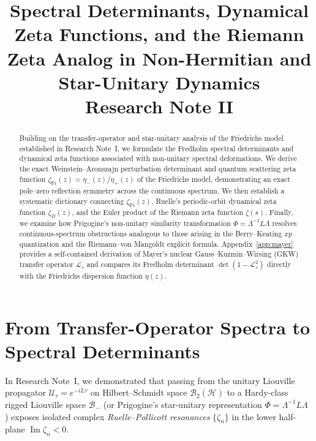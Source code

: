 \documentclass[11pt,a4paper]{article}
\title{\textbf{Spectral Determinants, Dynamical Zeta Functions, and the Riemann Zeta Analog in Non-Hermitian and Star-Unitary Dynamics}\\[0.4em]
\large Research Note II}
\author{}
\date{}
\newcommand{\Imag}{\operatorname{Im}}
\begin{document}
\maketitle

\begin{abstract}
Building on the transfer-operator and star-unitary analysis of the Friedrichs model established in Research Note~I, we formulate the Fredholm spectral determinants and dynamical zeta functions associated with non-unitary spectral deformations. We derive the exact Weinstein--Aronszajn perturbation determinant and quantum scattering zeta function $\zeta_{\mathrm{Fr}}(z) = \eta_-(z)/\eta_+(z)$ of the Friedrichs model, demonstrating an exact pole--zero reflection symmetry across the continuous spectrum. We then establish a systematic dictionary connecting $\zeta_{\mathrm{Fr}}(z)$, Ruelle's periodic-orbit dynamical zeta function $\zeta_D(z)$, and the Euler product of the Riemann zeta function $\zeta(s)$. Finally, we examine how Prigogine's non-unitary similarity transformation $\Phi = \Lambda^{-1}L\Lambda$ resolves continuous-spectrum obstructions analogous to those arising in the Berry--Keating $xp$ quantization and the Riemann--von Mangoldt explicit formula. Appendix~\ref{app:mayer} provides a self-contained derivation of Mayer's nuclear Gauss--Kuzmin--Wirsing (GKW) transfer operator $\mathcal{L}_s$ and compares its Fredholm determinant $\det(1 - \mathcal{L}_s^2)$ directly with the Friedrichs dispersion function $\eta(z)$.
\end{abstract}

\section{From Transfer-Operator Spectra to Spectral Determinants}

In Research Note~I, we demonstrated that passing from the unitary Liouville propagator $\mathcal{U}_\tau = e^{-iL\tau}$ on Hilbert--Schmidt space $\mathcal{B}_2(\mathcal{H})$ to a Hardy-class rigged Liouville space $\mathcal{B}_-$ (or Prigogine's star-unitary representation $\Phi = \Lambda^{-1}L\Lambda$ \cite{Prigogine1977}) exposes isolated complex \emph{Ruelle--Pollicott resonances} $\{\zeta_n\}$ in the lower half-plane $\Imag \zeta_n < 0$.
\end{document}

